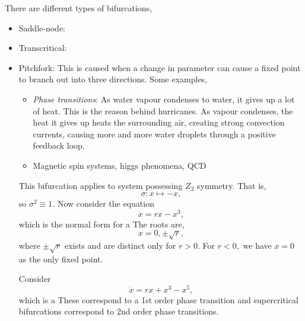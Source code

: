 \documentclass{article}
\numberwithin{equation}{section}
\begin{document}
There are different types of bifurcations,
\begin{itemize}
    \item Saddle-node:
    \item Transcritical:
    \item Pitchfork: This is caused when a change in parameter can cause a fixed point to branch out into three directions. Some examples,
    \begin{itemize}
        \item \textit{Phase transitions}: As water vapour condenses to water, it gives up a lot of heat. This is the reason behind hurricanes. As vapour condenses, the heat it gives up heats the surrounding air, creating strong convection currents, causing more and more water droplets through a positive feedback loop.
        \item Magnetic spin systems, higgs phenomena, QCD
    \end{itemize}
    This bifurcation applies to system possessing $Z_2$ symmetry. That is,
    \begin{equation*}
        \sigma: x \mapsto -x,
    \end{equation*}
    so $\sigma^2 \equiv 1.$ Now consider the equation
    \begin{equation*}
        \dot{x} = rx-x^3,
    \end{equation*}
    which is the normal form for a  The roots are,
    \begin{equation*}
        x=0,\pm\sqrt{r},
    \end{equation*}
    where $\pm\sqrt{r}$ exists and are distinct only for $r>0.$ For $r<0,$ we have $x=0$ as the only fixed point.
    \begin{center}
    \end{center}
    Consider
    \begin{equation*}
        \dot{x}=rx+x^3-x^5,
    \end{equation*}
    which is a  These correspond to a 1st order phase transition and supercritical bifurcations correspond to 2nd order phase transitions.


\end{itemize}
\end{document}
